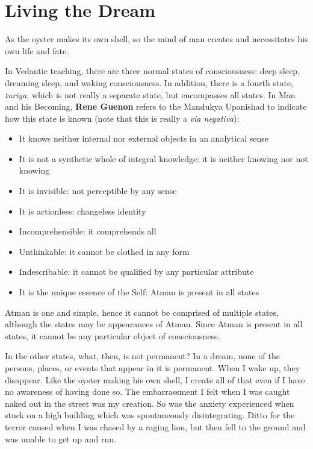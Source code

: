 \section{Living the Dream}

\begin{quotex}
As the oyster makes its own shell, so the mind of man creates and necessitates his own life and fate.
\end{quotex}


In Vedantic teaching, there are three normal states of consciousness: deep sleep, dreaming sleep, and waking consciousness. In addition, there is a fourth state, \emph{turiya}, which is not really a separate state, but encompasses all states. In Man and his Becoming, \textbf{Rene Guenon} refers to the Mandukya Upanishad to indicate how this state is known (note that this is really a \emph{via negativa}):

\begin{itemize}


\item It knows neither internal nor external objects in an analytical sense
\item It is not a synthetic whole of integral knowledge: it is neither knowing nor not knowing 
\item It is invisible: not perceptible by any sense 
\item It is actionless: changeless identity 
\item Incomprehensible: it comprehends all 
\item Unthinkable: it cannot be clothed in any form 
\item Indescribable: it cannot be qualified by any particular attribute 
\item It is the unique essence of the Self: Atman is present in all states 
\end{itemize}


Atman is one and simple, hence it cannot be comprised of multiple states, although the states may be appearances of Atman. Since Atman is present in all states, it cannot be any particular object of consciousness.

In the other states, what, then, is not permanent? In a dream, none of the persons, places, or events that appear in it is permanent. When I wake up, they disappear. Like the oyster making his own shell, I create all of that even if I have no awareness of having done so. The embarrassment I felt when I was caught naked out in the street was my creation. So was the anxiety experienced when stuck on a high building which was spontaneously disintegrating. Ditto for the terror caused when I was chased by a raging lion, but then fell to the ground and was unable to get up and run.

